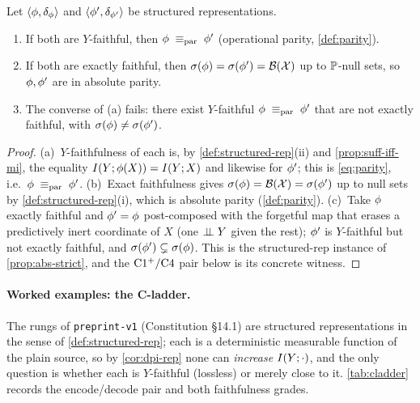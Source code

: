 \begin{proposition}
\label{prop:decode-parity}
Let $\langle \phi, \delta_{\phi}\rangle$ and $\langle\phi',\delta_{\phi'}\rangle$ be structured
representations.
\begin{enumerate}
  \item[(a)] If both are $Y$-faithful, then $\phi\;\equiv_{\mathrm{par}}\;\phi'$
    (operational parity, \cref{def:parity}).
  \item[(b)] If both are exactly faithful, then $\sigma\!\left(\phi\right)=\sigma\!\left(\phi'\right)
    =\mathcal{B}(\mathcal{X})$ up to $\mathbb{P}$-null sets, so $\phi,\phi'$ are in absolute
    parity.
  \item[(c)] The converse of (a) fails: there exist $Y$-faithful $\phi\;\equiv_{\mathrm{par}}\;
    \phi'$ that are not exactly faithful, with $\sigma\!\left(\phi\right)\ne\sigma\!\left(\phi'\right)$.
\end{enumerate}
\end{proposition}

\begin{proof}
(a)~$Y$-faithfulness of each is, by \cref{def:structured-rep}(ii) and
\cref{prop:suff-iff-mi}, the equality $I(Y ; \phi(X))=I(Y ; X)$ and likewise
for $\phi'$; this is \eqref{eq:parity}, i.e.\ $\phi\;\equiv_{\mathrm{par}}\;\phi'$. (b)~Exact
faithfulness gives $\sigma\!\left(\phi\right)=\mathcal{B}(\mathcal{X})=\sigma\!\left(\phi'\right)$ up to null sets by
\cref{def:structured-rep}(i), which is absolute parity (\cref{def:parity}).
(c)~Take $\phi$ exactly faithful and $\phi'=\phi$ post-composed with the
forgetful map that erases a predictively inert coordinate of $X$ (one
$\perp\!\!\!\perp Y$ given the rest); $\phi'$ is $Y$-faithful but not exactly faithful,
and $\sigma\!\left(\phi'\right)\subsetneq\sigma\!\left(\phi\right)$. This is the structured-rep
instance of \cref{prop:abs-strict}, and the $\mathrm{C1^{+}}/\mathrm{C}4$ pair below
is its concrete witness.
\end{proof}

\paragraph{Worked examples: the C-ladder.}
The rungs of \texttt{preprint-v1} (Constitution §14.1) are structured
representations in the sense of \cref{def:structured-rep}; each is a
deterministic measurable function of the plain source, so by
\cref{cor:dpi-rep} none can \emph{increase} $I(Y ; \cdot)$, and the only
question is whether each is $Y$-faithful (lossless) or merely close to it.
\cref{tab:cladder} records the encode/decode pair and both faithfulness grades.

